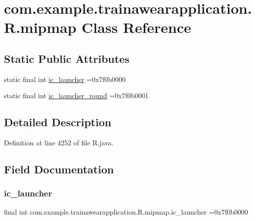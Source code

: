 \hypertarget{classcom_1_1example_1_1trainawearapplication_1_1_r_1_1mipmap}{}\section{com.\+example.\+trainawearapplication.\+R.\+mipmap Class Reference}
\label{classcom_1_1example_1_1trainawearapplication_1_1_r_1_1mipmap}
\subsection*{Static Public Attributes}
\begin{DoxyCompactItemize}
\item 
static final int \mbox{\hyperlink{classcom_1_1example_1_1trainawearapplication_1_1_r_1_1mipmap_a926f8b2f7e4512ba5c7791ce7b544193}{ic\+\_\+launcher}} =0x7f0b0000
\item 
static final int \mbox{\hyperlink{classcom_1_1example_1_1trainawearapplication_1_1_r_1_1mipmap_a9fa53e4ffcc464ff3e40e922985284cc}{ic\+\_\+launcher\+\_\+round}} =0x7f0b0001
\end{DoxyCompactItemize}


\subsection{Detailed Description}


Definition at line 4252 of file R.\+java.



\subsection{Field Documentation}
\mbox{\label{classcom_1_1example_1_1trainawearapplication_1_1_r_1_1mipmap_a926f8b2f7e4512ba5c7791ce7b544193}} 
\subsubsection{\texorpdfstring{ic\_launcher}{ic\_launcher}}
{\footnotesize\ttfamily final int com.\+example.\+trainawearapplication.\+R.\+mipmap.\+ic\+\_\+launcher =0x7f0b0000\hspace{0.3cm}{\ttfamily [static]}}



